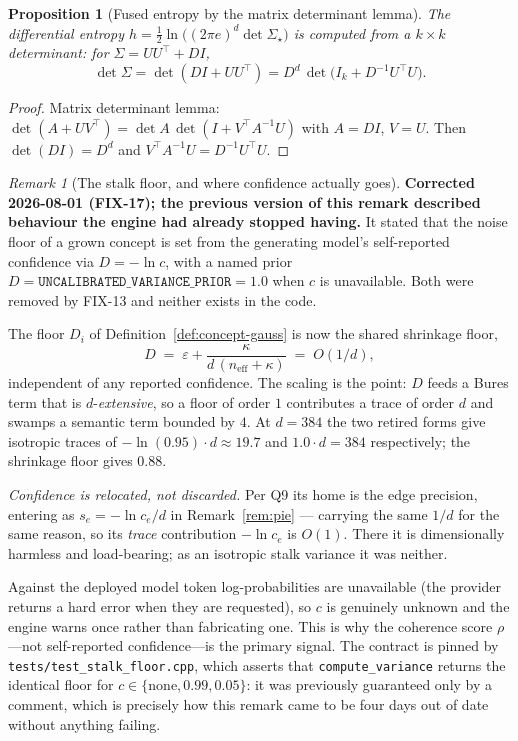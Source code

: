 \documentclass[11pt]{article}
\theoremstyle{definition}
\theoremstyle{plain}
\newtheorem{proposition}[definition]{Proposition}
\theoremstyle{remark}
\newtheorem{remark}[definition]{Remark}
\begin{document}
\begin{proposition}[Fused entropy by the matrix determinant lemma]
The differential entropy $h=\tfrac12\ln\!\big((2\pi e)^d\det\Sigma_\star\big)$ is
computed from a $k\times k$ determinant: for $\Sigma=UU^\top+DI$,
\begin{equation}\label{eq:mdl}
\det\Sigma=\det(DI+UU^\top)=D^{d}\,\det\!\big(I_k+D^{-1}U^\top U\big).
\end{equation}
\end{proposition}
\begin{proof}
Matrix determinant lemma: $\det(A+UV^\top)=\det A\,\det(I+V^\top A^{-1}U)$ with
$A=DI$, $V=U$. Then $\det(DI)=D^d$ and $V^\top A^{-1}U=D^{-1}U^\top U$.
\end{proof}

\begin{remark}[The stalk floor, and where confidence actually goes]\label{rem:uncal}
\textbf{Corrected 2026-08-01 (FIX-17); the previous version of this remark
described behaviour the engine had already stopped having.} It stated that the
noise floor of a grown concept is set from the generating model's self-reported
confidence via $D=-\ln c$, with a named prior
$D=\texttt{UNCALIBRATED\_VARIANCE\_PRIOR}=1.0$ when $c$ is unavailable. Both were
removed by FIX-13 and neither exists in the code.

The floor $D_i$ of Definition~\ref{def:concept-gauss} is now the shared shrinkage
floor,
\[
  D \;=\; \varepsilon + \frac{\kappa}{d\,(n_{\mathrm{eff}}+\kappa)} \;=\; O(1/d),
\]
independent of any reported confidence. The scaling is the point: $D$ feeds a
Bures term that is $d$-\emph{extensive}, so a floor of order $1$ contributes a
trace of order $d$ and swamps a semantic term bounded by $4$. At $d=384$ the two
retired forms give isotropic traces of $-\ln(0.95)\cdot d\approx19.7$ and
$1.0\cdot d=384$ respectively; the shrinkage floor gives $0.88$.

\emph{Confidence is relocated, not discarded.} Per Q9 its home is the edge
precision, entering as $s_e=-\ln c_e/d$ in Remark~\ref{rem:pie} --- carrying the
same $1/d$ for the same reason, so its \emph{trace} contribution $-\ln c_e$ is
$O(1)$. There it is dimensionally harmless and load-bearing; as an isotropic
stalk variance it was neither.

Against the deployed model token log-probabilities are unavailable (the provider
returns a hard error when they are requested), so $c$ is genuinely unknown and
the engine warns once rather than fabricating one. This is why the coherence
score $\rho$---not self-reported confidence---is the primary signal. The contract
is pinned by \texttt{tests/test\_stalk\_floor.cpp}, which asserts that
\texttt{compute\_variance} returns the identical floor for $c\in\{\text{none},
0.99, 0.05\}$: it was previously guaranteed only by a comment, which is precisely
how this remark came to be four days out of date without anything failing.
\end{remark}
\end{document}
